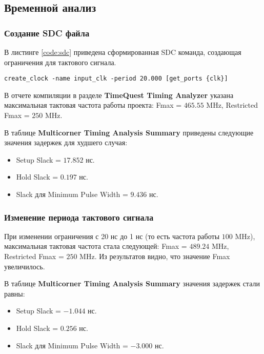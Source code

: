 
\subsection{Временной анализ}

\subsubsection{Создание SDC файла}

В листинге \ref{code:sdc} приведена сформированная SDC команда, создающая ограничения для тактового сигнала.

\begin{lstlisting}[caption=Synopsys Design Constraints (SDC) файл, label=code:sdc]
create_clock -name input_clk -period 20.000 [get_ports {clk}]
\end{lstlisting}

В отчете компиляции в разделе \textbf{TimeQuest Timing Analyzer} указана максимальная тактовая частота работы проекта: Fmax = $465.55$ MHz, Restricted Fmax = $250$ MHz.

В таблице \textbf{Multicorner Timing Analysis Summary} приведены следующие значения задержек для худшего случая:
\begin{itemize}
\setlength\itemsep{0em}
\item Setup Slack = $17.852$ нс.
\item Hold Slack = $0.197$ нс.
\item Slack для Minimum Pulse Width = $9.436$ нс.
\end{itemize}

\subsubsection{Изменение периода тактового сигнала}

При изменении ограничения с 20 нс до 1 нс (то есть частота работы $10$0 MHz), максимальная тактовая частота стала следующей: Fmax = $489.24$ MHz, Restricted Fmax = $250$ MHz. Из результатов видно, что значение Fmax увеличилось.

В таблице \textbf{Multicorner Timing Analysis Summary} значения задержек стали равны:
\begin{itemize}
\setlength\itemsep{0em}
\item Setup Slack = $-1.044$ нс.
\item Hold Slack = $0.256$ нс.
\item Slack для Minimum Pulse Width = $-3.000$ нс.
\end{itemize}

